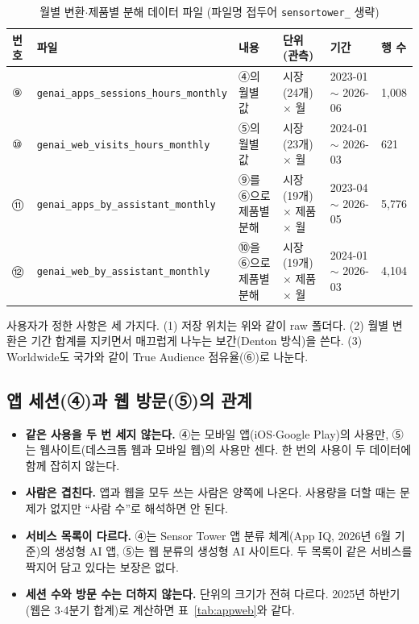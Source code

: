 \documentclass[11pt]{article}
\begin{document}
\begin{longtable}{L{0.8cm}L{4.4cm}L{2.8cm}L{2.6cm}L{2.2cm}L{1.2cm}}
\caption{월별 변환$\cdot$제품별 분해 데이터 파일 (파일명 접두어 \texttt{sensortower\_} 생략)}\label{tab:monthlyfiles}\\
\toprule
번호 & 파일 & 내용 & 단위(관측) & 기간 & 행 수 \\
\midrule
\endhead
⑨ & \texttt{genai\_apps\_sessions\_hours\_monthly} & ④의 월별 값 & 시장(24개) $\times$ 월 & 2023-01 $\sim$ 2026-06 & 1,008 \\
⑩ & \texttt{genai\_web\_visits\_hours\_monthly} & ⑤의 월별 값 & 시장(23개) $\times$ 월 & 2024-01 $\sim$ 2026-03 & 621 \\
⑪ & \texttt{genai\_apps\_by\_assistant\_monthly} & ⑨를 ⑥으로 제품별 분해 & 시장(19개) $\times$ 제품 $\times$ 월 & 2023-04 $\sim$ 2026-05 & 5,776 \\
⑫ & \texttt{genai\_web\_by\_assistant\_monthly} & ⑩을 ⑥으로 제품별 분해 & 시장(19개) $\times$ 제품 $\times$ 월 & 2024-01 $\sim$ 2026-03 & 4,104 \\
\bottomrule
\end{longtable}

사용자가 정한 사항은 세 가지다. (1) 저장 위치는 위와 같이 raw 폴더다. (2) 월별 변환은 기간 합계를 지키면서 매끄럽게 나누는 보간(Denton 방식)을 쓴다. (3) Worldwide도 국가와 같이 True Audience 점유율(⑥)로 나눈다.

\subsection{앱 세션(④)과 웹 방문(⑤)의 관계}

\begin{itemize}
  \item \textbf{같은 사용을 두 번 세지 않는다.} ④는 모바일 앱(iOS$\cdot$Google Play)의 사용만, ⑤는 웹사이트(데스크톱 웹과 모바일 웹)의 사용만 센다. 한 번의 사용이 두 데이터에 함께 잡히지 않는다.
  \item \textbf{사람은 겹친다.} 앱과 웹을 모두 쓰는 사람은 양쪽에 나온다. 사용량을 더할 때는 문제가 없지만 ``사람 수''로 해석하면 안 된다.
  \item \textbf{서비스 목록이 다르다.} ④는 Sensor Tower 앱 분류 체계(App IQ, 2026년 6월 기준)의 생성형 AI 앱, ⑤는 웹 분류의 생성형 AI 사이트다. 두 목록이 같은 서비스를 짝지어 담고 있다는 보장은 없다.
  \item \textbf{세션 수와 방문 수는 더하지 않는다.} 단위의 크기가 전혀 다르다. 2025년 하반기(웹은 3$\cdot$4분기 합계)로 계산하면 표~\ref{tab:appweb}와 같다.
\end{itemize}
\end{document}
